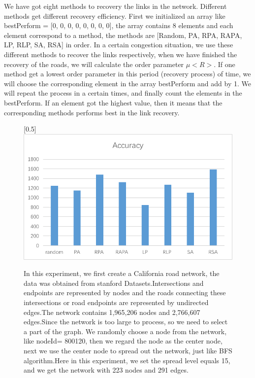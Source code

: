 \documentclass[onecolumn,preprintnumbers,amsmath,amssymb]{revtex4}
\begin{document}
We have got eight methods to recovery the links in the network. Different methods get different recovery efficiency. First we initialized an array like bestPerform = [0, 0, 0, 0, 0, 0, 0, 0], the array contains 8 elements and each element correspond to a method, the methods are [Random, PA, RPA, RAPA, LP, RLP, SA, RSA] in order. In a certain congestion  situation, we use these different methods to recover the links respectively, when we have finished the recovery of the roads, we will calculate the order parameter $\mu<R>$. If one method get a lowest order parameter in this period (recovery process) of time, we will choose the corresponding element in the array bestPerform and add by 1. We will repeat the process in a certain times, and finally count the elements in the  bestPerform. If an element got the highest value, then it means that the corresponding methods performs best in the link recovery.


\begin{figure}[ht]
\scalebox{0.5}[0.5]{\includegraphics[trim=0 10 0 0]{road.png}}
\caption{In this experiment, we first create a California road network, the data was obtained from stanford Datasets.Intersections and endpoints are represented by nodes and the roads connecting these intersections or road endpoints are represented by undirected edges.The network contains 1,965,206	 nodes and 2,766,607 edges.Since the network is too large to process, so we need to select a part of the graph. We randomly choose a node from the network, like nodeId= 800120, then we regard the node as the center node, next we use the center node to spread out the network, just like BFS algorithm.Here in this experiment, we set the spread level equals 15, and we get the network with 223 nodes and 291 edges.}\label{BAZD}
\end{figure}
\end{document}
